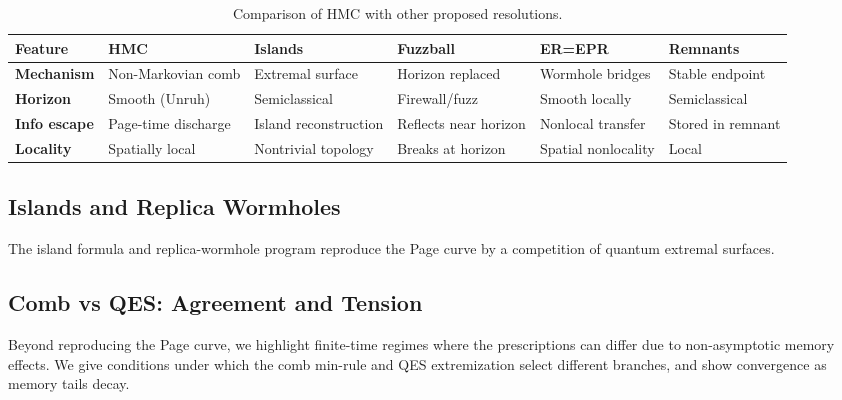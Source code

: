 \documentclass[aps,prd,preprint,onecolumn,superscriptaddress,nofootinbib,longbibliography,floatfix,11pt,showpacs,showkeys]{revtex4-2}
\newcommand{\HMC}{\textsc{HMC}\xspace}
\theoremstyle{plain}
\theoremstyle{definition}
\theoremstyle{remark}
\begin{document}
\begin{table}[htbp]
\centering
\caption{Comparison of \HMC{} with other proposed resolutions.}
\label{tab:comparison}
\scriptsize
\begin{tabular}{l l l l l l}
\toprule
\textbf{Feature} & \textbf{HMC} & \textbf{Islands} & \textbf{Fuzzball} & \textbf{ER=EPR} & \textbf{Remnants} \\ \midrule
\textbf{Mechanism} & \parbox[t]{0.15\textwidth}{\raggedright Non-Markovian comb} & \parbox[t]{0.15\textwidth}{\raggedright Extremal surface} & \parbox[t]{0.15\textwidth}{\raggedright Horizon replaced} & \parbox[t]{0.15\textwidth}{\raggedright Wormhole bridges} & \parbox[t]{0.15\textwidth}{\raggedright Stable endpoint} \\
\addlinespace
\textbf{Horizon} & \parbox[t]{0.15\textwidth}{\raggedright Smooth (Unruh)} & \parbox[t]{0.15\textwidth}{\raggedright Semiclassical} & \parbox[t]{0.15\textwidth}{\raggedright Firewall/fuzz} & \parbox[t]{0.15\textwidth}{\raggedright Smooth locally} & \parbox[t]{0.15\textwidth}{\raggedright Semiclassical} \\
\addlinespace
\textbf{Info escape} & \parbox[t]{0.15\textwidth}{\raggedright Page-time discharge} & \parbox[t]{0.15\textwidth}{\raggedright Island reconstruction} & \parbox[t]{0.15\textwidth}{\raggedright Reflects near horizon} & \parbox[t]{0.15\textwidth}{\raggedright Nonlocal transfer} & \parbox[t]{0.15\textwidth}{\raggedright Stored in remnant} \\
\addlinespace
\textbf{Locality} & \parbox[t]{0.15\textwidth}{\raggedright Spatially local} & \parbox[t]{0.15\textwidth}{\raggedright Nontrivial topology} & \parbox[t]{0.15\textwidth}{\raggedright Breaks at horizon} & \parbox[t]{0.15\textwidth}{\raggedright Spatial nonlocality} & \parbox[t]{0.15\textwidth}{\raggedright Local} \\
\bottomrule
\end{tabular}
\end{table}

\subsection{Islands and Replica Wormholes}
The island formula and replica-wormhole program \cite{Penington:2020,Almheiri:2020,Chen:2020}
reproduce the Page curve by a competition of quantum extremal surfaces.

\subsection{Comb vs QES: Agreement and Tension}
Beyond reproducing the Page curve, we highlight finite-time regimes where the prescriptions can differ due to non-asymptotic memory effects. We give conditions under which the comb min-rule and QES extremization select different branches, and show convergence as memory tails decay. 
\end{document}
